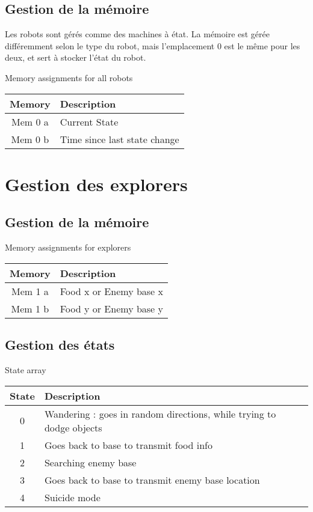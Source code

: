 \documentclass{article}
\begin{document}
\subsection{Gestion de la mémoire}

Les robots sont gérés comme des machines à état.
La mémoire est gérée différemment selon le type du robot, mais l'emplacement 0 est le même pour les deux, et sert à stocker l'état du robot.

\begin{table}[!htb]
	Memory assignments for all robots\\
	\begin{tabular}{|c|l|}
		\hline
		Memory & Description\\
		\hline
		Mem 0 a & Current State\\
		Mem 0 b & Time since last state change\\
		\hline
	\end{tabular}
\end{table}

\section{Gestion des explorers}

\subsection{Gestion de la mémoire}

\begin{table}[!htb]
	Memory assignments for explorers\\
	\begin{tabular}{|c|l|}
		\hline
		Memory & Description\\
		\hline
		Mem 1 a & Food x or Enemy base x\\
		Mem 1 b & Food y or Enemy base y\\
		\hline
	\end{tabular}
\end{table}

\subsection{Gestion des états}

\begin{table}[!htb]
	State array\\
	\begin{tabular}{|c|l|}
		\hline
		State & Description \\
		\hline
		0 & Wandering : goes in random directions, while trying to dodge objects\\
		\hline
		1 & Goes back to base to transmit food info\\
		\hline
		2 & Searching enemy base\\
		\hline
		3 & Goes back to base to transmit enemy base location\\
		\hline
		4 & Suicide mode\\
		\hline
	\end{tabular}
\end{table}
\end{document}
